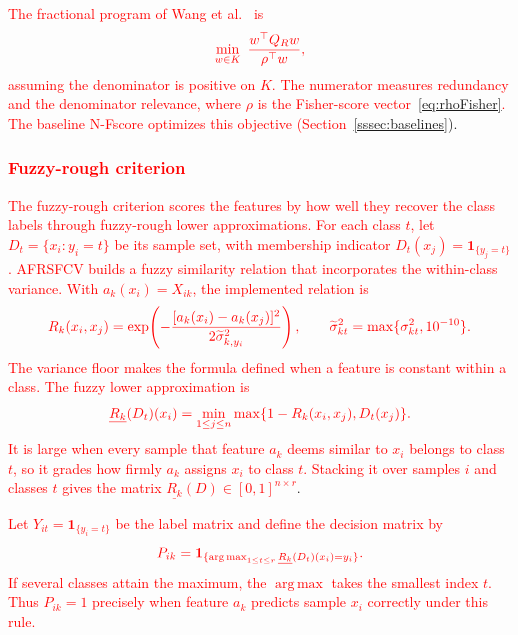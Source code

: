\documentclass[]{interact}
\theoremstyle{plain}
\theoremstyle{definition}
\theoremstyle{remark}
\DeclareMathOperator*{\argmax}{arg\,max}
\begin{document}
\leavevmode\textcolor{red}{The fractional program of Wang et al.~\citep{wang2021fractional} is}
\begin{equation}\label{eq:wangOrig}\textcolor{red}{
\min_{w\in K}\ \frac{w^{\top}Q_Rw}{\rho^{\top}w},
}\end{equation}
\leavevmode\textcolor{red}{assuming the denominator is positive on $K$. The numerator measures redundancy and the denominator relevance, where $\rho$ is the Fisher-score vector~\eqref{eq:rhoFisher}. The baseline N-Fscore optimizes this objective (Section~\ref{sssec:baselines}}).

\subsubsection{\textcolor{red}{Fuzzy-rough criterion}}\label{ssec:afrsfcv}\label{sssec:afrsfcv-inputs}\label{sssec:afrsfcv-model}
\leavevmode\textcolor{red}{The fuzzy-rough criterion scores the features by how well they recover the class labels through fuzzy-rough lower approximations. For each class $t$, let $D_t=\{x_i:y_i=t\}$ be its sample set, with membership indicator $D_t(x_j)=\mathbf1_{\{y_j=t\}}$. AFRSFCV builds a fuzzy similarity relation that incorporates the within-class variance. With $a_k(x_i)=X_{ik}$, the implemented relation is}
\begin{equation}\label{eq:simRel}\textcolor{red}{
R_k(x_i,x_j)=\exp\!\left(-\frac{[a_k(x_i)-a_k(x_j)]^2}{2\widetilde\sigma_{k,y_i}^2}\right),
\qquad \widetilde\sigma_{kt}^2=\max\{\sigma_{kt}^2,10^{-10}\}.
}\end{equation}
\leavevmode\textcolor{red}{The variance floor makes the formula defined when a feature is constant within a class. The fuzzy lower approximation is}
\begin{equation}\label{eq:lower}\textcolor{red}{
\underline{R_k}(D_t)(x_i)=\min_{1\le j\le n}\max\{1-R_k(x_i,x_j),D_t(x_j)\}.
}\end{equation}
\leavevmode\textcolor{red}{It is large when every sample that feature $a_k$ deems similar to $x_i$ belongs to class $t$, so it grades how firmly $a_k$ assigns $x_i$ to class $t$. Stacking it over samples $i$ and classes $t$ gives the matrix $\underline{R_k}(D)\in[0,1]^{n\times r}$}.

\leavevmode\textcolor{red}{Let $Y_{it}=\mathbf1_{\{y_i=t\}}$ be the label matrix and define the decision matrix by}
\begin{equation}\label{eq:Pmat}\textcolor{red}{
P_{ik}=\mathbf1_{\{\argmax_{1\le t\le r}\underline{R_k}(D_t)(x_i)=y_i\}}.
}\end{equation}
\leavevmode\textcolor{red}{If several classes attain the maximum, the $\argmax$ takes the smallest index $t$. Thus $P_{ik}=1$ precisely when feature $a_k$ predicts sample $x_i$ correctly under this rule.}
\end{document}
